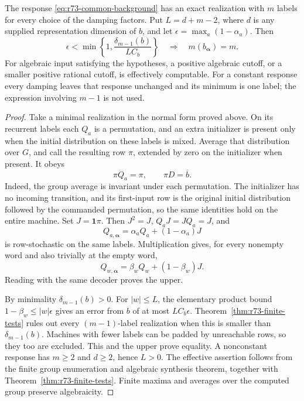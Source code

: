 \begin{theorem}\label{thm:r73-memory-plateau}
The response \eqref{eq:r73-common-background} has an exact realization with
$m$ labels for every choice of the damping factors. Put $L=d+m-2$, where
$d$ is any supplied representation dimension of $b$, and let
$\epsilon=\max_a(1-\alpha_a)$. Then
\begin{equation}\label{eq:r73-memory-plateau}
 \epsilon<\min\left\{1,\frac{\delta_{m-1}(b)}{LC_b}\right\}
 \quad\Longrightarrow\quad m(b_{\boldsymbol\alpha})=m.
\end{equation}
For algebraic input satisfying the hypotheses, a positive algebraic cutoff,
or a smaller positive rational cutoff, is effectively computable.
For a constant response every damping leaves that response unchanged and its
minimum is one label; the expression involving $m-1$ is not used.
\end{theorem}
\begin{proof}
Take a minimal realization in the normal form proved above. On its recurrent
labels each $Q_a$ is a permutation, and an extra initializer is present only
when the initial distribution on these labels is mixed. Average that
distribution over $G$, and call the resulting row $\pi$, extended by zero
on the initializer when present. It obeys
\[
 \pi Q_a=\pi,\qquad \pi D=\overline b.
\]
Indeed, the group average is invariant under each permutation. The initializer
has no incoming transition, and its first-input row is the original initial
distribution followed by the commanded permutation, so the same identities
hold on the entire machine. Set $J=\mathbf1\pi$. Then
$J^2=J$, $Q_aJ=JQ_a=J$, and
\[
 Q_{a,\boldsymbol\alpha}=\alpha_aQ_a+(1-\alpha_a)J
\]
is row-stochastic on the same labels. Multiplication gives, for every nonempty
word and also trivially at the empty word,
\[
 Q_{w,\boldsymbol\alpha}=\beta_wQ_w+(1-\beta_w)J.
\]
Reading with the same decoder proves the upper.

By minimality $\delta_{m-1}(b)>0$. For $|w|\le L$, the elementary product
bound $1-\beta_w\le |w|\epsilon$ gives an error from $b$ of at most
$LC_b\epsilon$. Theorem~\ref{thm:r73-finite-tests} rules out every
$(m-1)$-label realization when this is smaller than $\delta_{m-1}(b)$.
Machines with fewer labels can be padded by unreachable rows, so they too are
excluded. This and the upper prove equality. A nonconstant response has
$m\ge2$ and $d\ge2$, hence $L>0$. The effective assertion follows from the
finite group enumeration and algebraic synthesis theorem, together with
Theorem~\ref{thm:r73-finite-tests}. Finite maxima and averages over the
computed group preserve algebraicity.
\end{proof}

